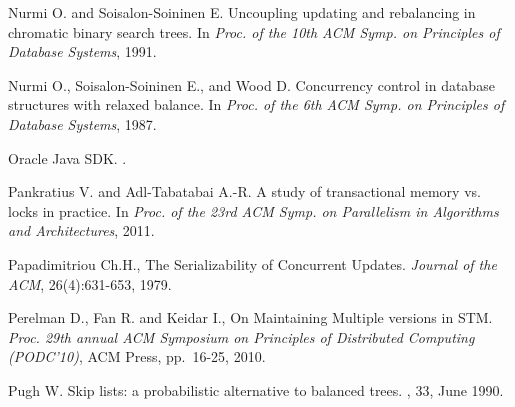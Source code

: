 \begin{thebibliography}{99}
{
Nurmi O. and Soisalon-Soininen E.
\newblock Uncoupling updating and rebalancing in chromatic binary search trees.
\newblock In {\em Proc. of the 10th ACM Symp. on Principles of Database
  Systems}, 1991.




Nurmi O., Soisalon-Soininen E., and Wood D.
\newblock Concurrency control in database structures with relaxed balance.
\newblock In {\em Proc. of the 6th ACM Symp. on Principles of Database
  Systems}, 1987.

% 


Oracle Java SDK.
.



Pankratius V. and Adl-Tabatabai A.-R.
\newblock A study of transactional memory vs. locks in practice.
\newblock In {\em Proc. of the 23rd ACM Symp. on Parallelism in Algorithms and
  Architectures}, 2011.



Papadimitriou Ch.H., 
The Serializability of Concurrent Updates. 
{\it Journal of the ACM},  26(4):631-653, 1979. 





Perelman D., Fan R. and Keidar I., 
On Maintaining Multiple versions in STM. 
{\em  Proc.   29th  annual  ACM    Symposium  on Principles  of Distributed
Computing (PODC'10)}, ACM Press, pp.~16-25, 2010. 



Pugh W.
\newblock Skip lists: a probabilistic alternative to balanced trees.
, 33, June 1990.


}
\end{thebibliography}
